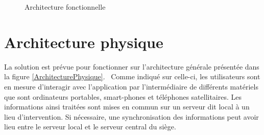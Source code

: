 \begin{figure}[htbp]
	\caption{Architecture fonctionnelle}
	\label{ArchitectureFonctionnelle}
\end{figure}

\section{Architecture physique}
La solution est prévue pour fonctionner sur l'architecture générale présentée dans la figure \ref{ArchitecturePhysique}.  \
Comme indiqué sur celle-ci, les utilisateurs sont en mesure d'interagir avec l'application par l'intermédiaire de différents matériels que sont ordinateurs portables, smart-phones et téléphones satellitaires. Les informations ainsi traitées sont mises en commun sur un serveur dit \og local \fg{} à un lieu d'intervention. Si nécessaire, une synchronisation des informations peut avoir lieu entre le serveur \og local \fg{} et le serveur \og central \fg{} du siège.

